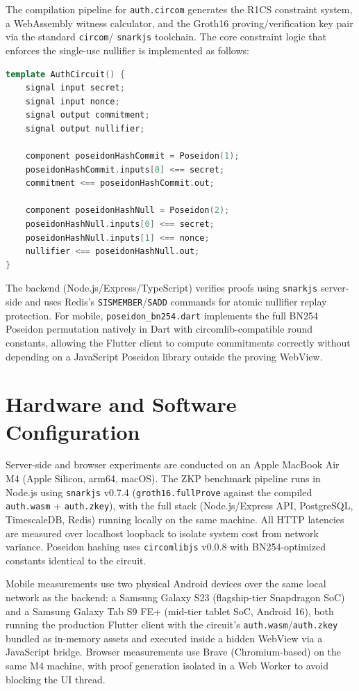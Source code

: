 \documentclass[12pt,a4paper,oneside]{report}
\begin{document}
The compilation pipeline for \texttt{auth.circom} generates the R1CS
constraint system, a WebAssembly witness calculator, and the Groth16
proving/verification key pair via the standard \texttt{circom}/
\texttt{snarkjs} toolchain. The core constraint logic that enforces the single-use nullifier is implemented as follows:

\begin{lstlisting}[language=C++, caption={Core Circom Nullifier Logic}]
template AuthCircuit() {
    signal input secret;
    signal input nonce;
    signal output commitment;
    signal output nullifier;

    component poseidonHashCommit = Poseidon(1);
    poseidonHashCommit.inputs[0] <== secret;
    commitment <== poseidonHashCommit.out;

    component poseidonHashNull = Poseidon(2);
    poseidonHashNull.inputs[0] <== secret;
    poseidonHashNull.inputs[1] <== nonce;
    nullifier <== poseidonHashNull.out;
}
\end{lstlisting}

The backend (Node.js/Express/TypeScript)
verifies proofs using \texttt{snarkjs} server-side and uses Redis's
\texttt{SISMEMBER}/\texttt{SADD} commands for atomic nullifier replay
protection. For mobile, \texttt{poseidon\_bn254.dart} implements the full
BN254 Poseidon permutation natively in Dart with circomlib-compatible round
constants, allowing the Flutter client to compute commitments correctly
without depending on a JavaScript Poseidon library outside the proving
WebView.

\section{Hardware and Software Configuration}

Server-side and browser experiments are conducted on an Apple MacBook Air
M4 (Apple Silicon, arm64, macOS). The ZKP benchmark pipeline runs in
Node.js using \texttt{snarkjs} v0.7.4 (\texttt{groth16.fullProve} against
the compiled \texttt{auth.wasm} + \texttt{auth.zkey}), with the full stack
(Node.js/Express API, PostgreSQL, TimescaleDB, Redis) running locally on
the same machine. All HTTP latencies are measured over localhost loopback
to isolate system cost from network variance. Poseidon hashing uses
\texttt{circomlibjs} v0.0.8 with BN254-optimized constants identical to
the circuit.

Mobile measurements use two physical Android devices over the same local
network as the backend: a Samsung Galaxy S23 (flagship-tier Snapdragon
SoC) and a Samsung Galaxy Tab S9 FE+ (mid-tier tablet SoC, Android 16),
both running the production Flutter client with the circuit's
\texttt{auth.wasm}/\texttt{auth.zkey} bundled as in-memory assets and
executed inside a hidden WebView via a JavaScript bridge. Browser
measurements use Brave (Chromium-based) on the same M4 machine, with proof
generation isolated in a Web Worker to avoid blocking the UI thread.
\end{document}
